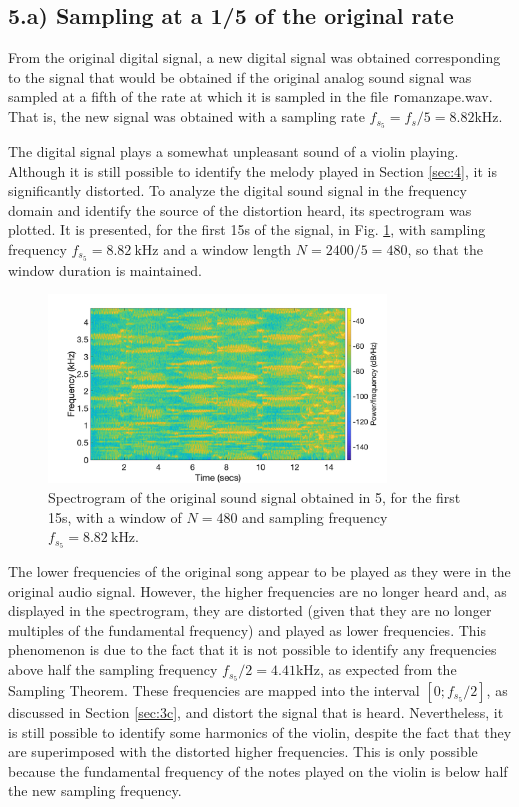 \documentclass[a4paper, oneside, 11pt]{article}
\begin{document}
\subsection{5.a) Sampling at a 1/5 of the original rate}\label{sec:5}
From the original digital signal, a new digital signal was obtained corresponding to the signal that would be obtained if the original analog sound signal was sampled at a fifth of the rate at which it is sampled in the file {\texttt romanza\textunderscore pe.wav}. That is, the new signal was obtained with a sampling rate $f_{s_5} = f_s/5 = 8.82$kHz.

The digital signal plays a somewhat unpleasant sound of a violin playing. Although it is still possible to identify the melody played in Section \ref{sec:4}, it is significantly distorted. To analyze the digital sound signal in the frequency domain and identify the source of the distortion heard, its spectrogram was plotted. It is presented, for the first 15s of the signal, in Fig. \ref{fig:spect_5}, with sampling frequency $f_{s_5} = \SI{8.82}{\kilo \hertz}$ and a window length $N = 2400/5=480$, so that the window duration is maintained.

\begin{figure}[h!]
	\centering
	\includegraphics[width=0.8\textwidth]{figures/spect_5.png}
	\caption{Spectrogram of the original sound signal obtained in 5, for the first 15s, with a window of $N = 480$ and sampling frequency $f_{s_5} = \SI{8.82}{\kilo \hertz}$.}
	\label{fig:spect_5}
\end{figure}

The lower frequencies of the original song appear to be played as they were in the original audio signal. However, the higher frequencies are no longer heard and, as displayed in the spectrogram, they are distorted (given that they are no longer multiples of the fundamental frequency) and played as lower frequencies. This phenomenon is due to the fact that it is not possible to identify any frequencies above half the sampling frequency $f_{s_5}/2 = 4.41$kHz, as expected from the Sampling Theorem. These frequencies are mapped into the interval $[0; f_{s_5}/2]$, as discussed in Section \ref{sec:3c}, and distort the signal that is heard. Nevertheless, it is still possible to identify some harmonics of the violin, despite the fact that they are superimposed with the distorted higher frequencies. This is only possible because the fundamental frequency of the notes played on the violin is below half the new sampling frequency.
\end{document}
